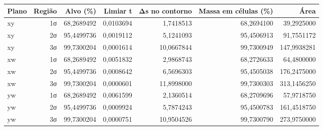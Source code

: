 \begin{tabular}{lrrrrrr}
\toprule
Plano & Região & Alvo (\%) & Limiar t & Δs no contorno & Massa em células (\%) & Área \\
\midrule
xy & 1σ & 68,2689492 & 0,0103694 & 1,7418513 & 68,2694100 & 39,2925000 \\
xy & 2σ & 95,4499736 & 0,0019112 & 5,1241093 & 95,4506913 & 91,7551172 \\
xy & 3σ & 99,7300204 & 0,0001614 & 10,0667844 & 99,7300949 & 147,9938281 \\
xw & 1σ & 68,2689492 & 0,0051832 & 2,9868743 & 68,2726633 & 64,4800000 \\
xw & 2σ & 95,4499736 & 0,0008642 & 6,5696303 & 95,4505038 & 176,2475000 \\
xw & 3σ & 99,7300204 & 0,0000601 & 11,8998000 & 99,7300303 & 313,1456250 \\
yw & 1σ & 68,2689492 & 0,0061599 & 2,1360514 & 68,2709696 & 57,9718750 \\
yw & 2σ & 95,4499736 & 0,0009924 & 5,7874243 & 95,4500783 & 161,4518750 \\
yw & 3σ & 99,7300204 & 0,0000751 & 10,9504526 & 99,7300790 & 273,9750000 \\
\bottomrule
\end{tabular}
